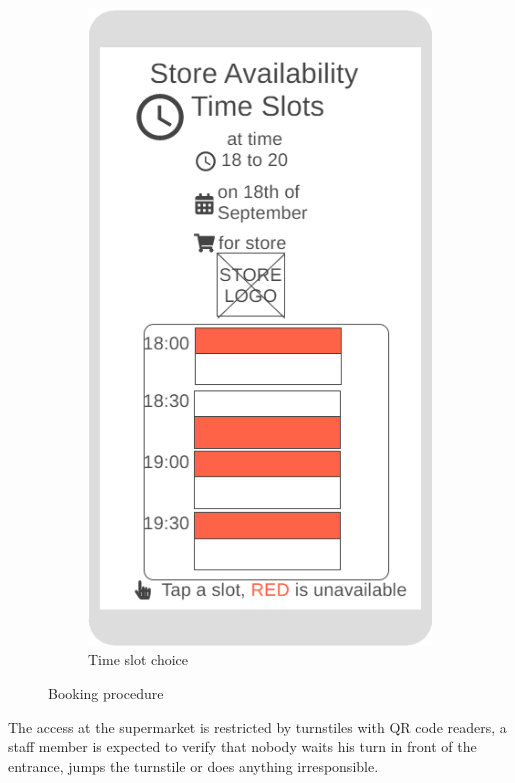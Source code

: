 \begin{figure}[h!]
\begin{subfigure}[b]{0.3\textwidth}
		\includegraphics[width=\linewidth]{../Diagrams/WireframesCLup/TimeSlots.png}
		\caption{Time slot choice}
		\label{fig:WfTimeSlots}
	\end{subfigure}
	\caption{Booking procedure}
	\label{fig:Wireframes}
\end{figure}
The access at the supermarket is restricted by turnstiles with QR code readers, a staff member is expected to verify that nobody waits his turn in front of the entrance, jumps the turnstile or does anything irresponsible.
